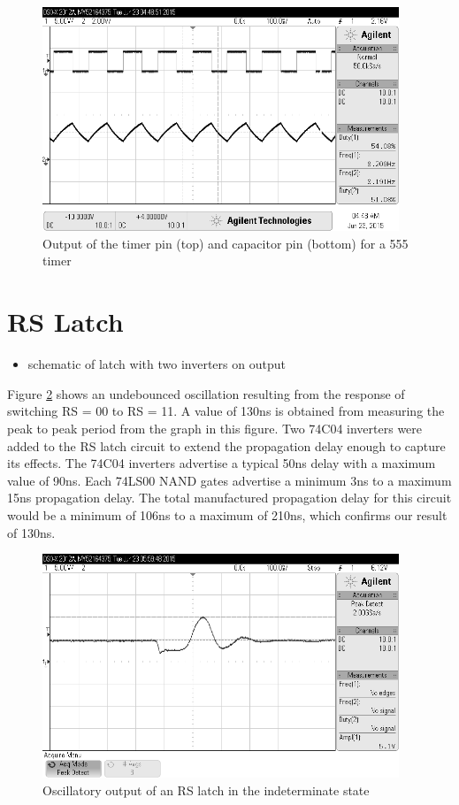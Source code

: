 \documentclass[11pt]{article}
\begin{document}
\begin{figure}[htpb]
	\centering
	\includegraphics[width=0.95\textwidth]{timer}
	\caption{Output of the timer pin (top) and capacitor pin (bottom) for a 555 timer}
	\label{fig:timer}
\end{figure}

\section{RS Latch}

\begin{itemize}
	\item schematic of latch with two inverters on output
\end{itemize}


Figure \ref{fig:rs_latch} shows an undebounced oscillation resulting from the response of switching RS = 00 to RS = 11. A value of 130ns is obtained from measuring the peak to peak period from the graph in this figure. Two 74C04 inverters were added to the RS latch circuit to extend the propagation delay enough to capture its effects. The 74C04 inverters advertise a typical 50ns delay with a maximum value of 90ns. Each 74LS00 NAND gates advertise a minimum 3ns to a maximum 15ns propagation delay. The total manufactured propagation delay for this circuit would be a minimum of 106ns to a maximum of 210ns, which confirms our result of 130ns.


\begin{figure}[htpb]
	\centering
	\includegraphics[width=0.95\textwidth]{rs_latch}
	\caption{Oscillatory output of an RS latch in the indeterminate state}
	\label{fig:rs_latch}
\end{figure}
\end{document}
